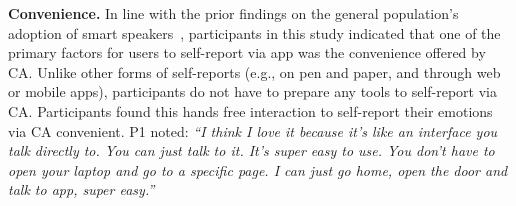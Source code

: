         \textbf{Convenience. }
        In line with the prior findings on the general population's adoption of smart speakers~\cite{lau2018alexa}, participants in this study indicated that one of the primary factors for users to self-report via \acl{app} was the convenience offered by \ac{CA}.
        Unlike other forms of self-reports (e.g., on pen and paper, and through web or mobile apps), participants do not have to prepare any tools to self-report via \ac{CA}. Participants found this hands free interaction to self-report their emotions via \ac{CA} convenient. P1 noted:
            \textit{
            ``I think I love it because it’s like an interface you talk directly to. You can just talk to it. It’s super easy to use. You don’t have to open your laptop and go to a specific page. I can just go home, open the door and talk to \acl{app}, super easy.'' 
            }
        

        
